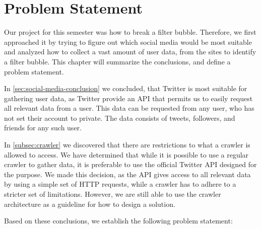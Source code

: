 \chapter{Problem Statement}\label{ch:problem}
Our project for this semester was how to break a filter bubble. Therefore, we
first approached it by trying to figure out which social media would be most
suitable and analyzed how to collect a vast amount of user data, from the sites
to identify a filter bubble.
This chapter will summarize the conclusions, and define a problem
statement.\nl

In \autoref{sec:social-media-conclusion} we concluded, that Twitter is most suitable
for gathering user data, as Twitter provide an \ac{API} that permits us to
easily request all relevant data from a user. This data can be requested from
any user, who has not set their account to private. The data consists of tweets,
followers, and friends for any such user.\nl

In \autoref{subsec:crawler} we discovered that there are restrictions to what
a crawler is allowed to access. We have determined that while it is possible to
use a regular crawler to gather data, it is preferable to use the official
Twitter \ac{API} designed for the purpose. We made this decision, as the
\ac{API} gives access to all relevant data by using a simple set of \ac{HTTP}
requests, while a crawler has to adhere to a stricter set of limitations.
However, we are still able to use the crawler architecture as a guideline for
how to design a solution.\nl


Based on these conclusions, we establish the following problem statement:

\begin{center}
\begin{minipage}{0.95\linewidth} 


\end{minipage}
\end{center}




